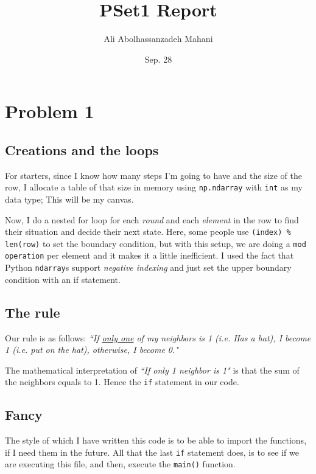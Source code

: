 \documentclass[12pt]{article}
\title{PSet1 Report}
\author{Ali Abolhassanzadeh Mahani}
\date{Sep. 28}
\begin{document}
    \maketitle
    \section{Problem 1}
    \subsection{Creations and the loops}
    For starters, since I know how many steps I'm going to have and the size of the row,
    I allocate a table of that size in memory using \texttt{np.ndarray} with \texttt{int} as my data type; This will be my canvas.
    
    Now,  I do a nested for loop for each \textit{round} and each \textit{element} in the row
    to find their situation and decide their next state. Here, some people use 
    \texttt{(index) \% len(row)} to set the boundary condition, but with this setup, we are doing a \texttt{mod operation} per element and it makes it a little inefficient. I used the fact that Python \texttt{ndarray}s support \emph{negative indexing} and just set the upper boundary condition with an if statement.
    
    \subsection{The rule}
    Our rule is as follows: \emph{``If \underline{only one} of my neighbors is 1 (i.e. Has a hat), I become 1 (i.e. put on the hat), otherwise, I become 0."}
    
    The mathematical interpretation of \emph{``If only 1 neighbor is 1"} is that the sum of the neighbors equals to 1. Hence the \texttt{if} statement in our code.
    
    \subsection{Fancy}
    The style of which I have written this code is to be able to import the functions, if I
    need them in the future. All that the last \texttt{if} statement does, is to see if we are executing this file, and then, execute the \texttt{main()} function.
	
\end{document}
